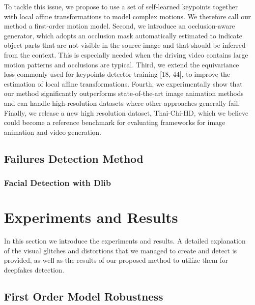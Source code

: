\documentclass[english,12pt]{article}
\begin{document}
To tackle this issue, we propose to use a set of self-learned keypoints together with local affine
transformations to model complex motions. We therefore call our method a first-order motion model. Second,
we introduce an occlusion-aware generator, which adopts an occlusion mask automatically estimated to indicate
object parts that are not visible in the source image and that should be inferred from the context. This is
especially needed when the driving video contains large motion patterns and occlusions are typical. Third,
we extend the equivariance loss commonly used for keypoints detector training [18, 44], to improve the
estimation of local affine transformations. Fourth, we experimentally show that our method significantly
outperforms state-of-the-art image animation methods and can handle high-resolution datasets where other
approaches generally fail. Finally, we release a new high resolution dataset, Thai-Chi-HD, which we believe
could become a reference benchmark for evaluating frameworks for image animation and video generation.





\subsection{Failures Detection Method}
\subsubsection{Facial Detection with Dlib}



\section{Experiments and Results} \label{experiments and results}

In this section we introduce the experiments and results. A detailed explanation of the
visual glitches and distortions that we managed to create and detect is provided, as well
as the results of our proposed method to utilize them for deepfakes detection.

\subsection{First Order Model Robustness}
\end{document}

